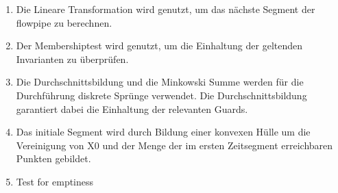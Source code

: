 
\begin{enumerate}
\item Die Lineare Transformation wird genutzt, um das nächste Segment der flowpipe zu berechnen.
\item Der Membershiptest wird genutzt, um die Einhaltung der geltenden Invarianten zu überprüfen.
\item Die Durchschnittsbildung und die Minkowski Summe werden für die Durchführung diskrete Sprünge verwendet. Die Durchschnittsbildung garantiert dabei die Einhaltung der relevanten Guards.
\item Das initiale Segment wird durch Bildung einer konvexen Hülle um die Vereinigung von X0 und der Menge der im ersten Zeitsegment erreichbaren Punkten gebildet.
\item Test for emptiness
\end{enumerate}
